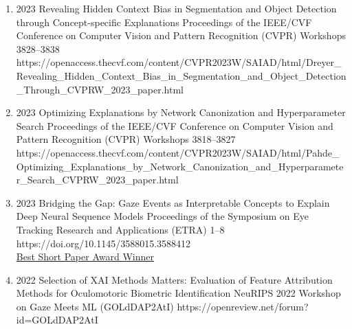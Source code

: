 {\begin{enumerate}
        \item {}
                            {2023}
                            {Revealing Hidden Context Bias in Segmentation and Object Detection through Concept-specific Explanations}
                            {Proceedings of the IEEE/CVF Conference on Computer Vision and Pattern Recognition (CVPR) Workshops}
                            {3828--3838}
                            {https://openaccess.thecvf.com/content/CVPR2023W/SAIAD/html/Dreyer_Revealing_Hidden_Context_Bias_in_Segmentation_and_Object_Detection_Through_CVPRW_2023_paper.html}

        \item {}
                            {2023}
                            {Optimizing Explanations by Network Canonization and Hyperparameter Search}
                            {Proceedings of the IEEE/CVF Conference on Computer Vision and Pattern Recognition (CVPR) Workshops}
                            {3818--3827}
                            {https://openaccess.thecvf.com/content/CVPR2023W/SAIAD/html/Pahde_Optimizing_Explanations_by_Network_Canonization_and_Hyperparameter_Search_CVPRW_2023_paper.html} 
                            

        \item {}
                            {2023}
                            {Bridging the Gap: Gaze Events as Interpretable Concepts to Explain Deep Neural Sequence Models}
                            {Proceedings of the Symposium on Eye Tracking Research and Applications (ETRA)}
                            {1--8}
                            {https://doi.org/10.1145/3588015.3588412} 
                            {\\\href{https://datacloud.hhi.fraunhofer.de/s/YExo6qyWDxksRof}{Best Short Paper Award Winner}}

        \item {}
                            {2022}
                            {Selection of XAI Methods Matters: Evaluation of Feature Attribution Methods for Oculomotoric Biometric Identification}
                            {NeuRIPS 2022 Workshop on Gaze Meets ML}
                            {(GOLdDAP2AtI)}
                            {https://openreview.net/forum?id=GOLdDAP2AtI} 



\end{enumerate}}
